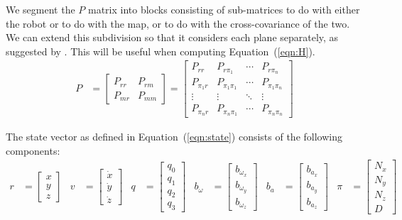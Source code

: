\documentclass[]{article}
\begin{document}
{We segment the $P$ matrix into blocks consisting of sub-matrices to do with either the robot or to do with the map, or to do with the cross-covariance of the two. We can extend this subdivision so that it considers each plane separately, as suggested by \cite{Sola2013}.
This will be useful when computing Equation~(\ref{eqn:H}).
\begin{align}
	P &=
	\left[
	\begin{matrix}
		P_{rr} 	& P_{rm} \\
		P_{mr} 	& P_{mm}
	\end{matrix}
	\right]
	=
	\left[
	\begin{matrix}
		P_{rr} 		& P_{r \pi_1} 		& \cdots 	& P_{r \pi_n} \\
		P_{\pi_1 r} & P_{\pi_1 \pi_1}	& \cdots 	& P_{\pi_1 \pi_n} \\
		\vdots		& \vdots 			& \ddots 	& \vdots \\
		P_{\pi_n r} & P_{\pi_n \pi_1} 	& \cdots 	& P_{\pi_n \pi_n}
	\end{matrix}
	\right]
	\label{eqn:Pparts}
\end{align}

The state vector as defined in Equation~(\ref{eqn:state}) consists of the following components:
\begin{align}
	r &= 
	\left[
	\begin{matrix}
		x \\
		y \\
		z
	\end{matrix}
	\right]
	&
	v &=
	\left[
	\begin{matrix}
		\dot{x} \\
		\dot{y} \\
		\dot{z}
	\end{matrix}
	\right]
	&
	q &=
	\left[
	\begin{matrix}
		q_0 \\
		q_1 \\
		q_2 \\
		q_3
	\end{matrix}
	\right]
	&
	b_\omega &=
	\left[
	\begin{matrix}
		b_{\omega_x} \\
		b_{\omega_y} \\
		b_{\omega_z} 
	\end{matrix}
	\right]
	&
	b_a &=
	\left[
	\begin{matrix}
		b_{a_x} \\
		b_{a_y} \\
		b_{a_z} 
	\end{matrix}
	\right]
	&
	\pi &=
	\left[
	\begin{matrix}
		N_x \\
		N_y \\
		N_z \\
		D
	\end{matrix}
	\right]
\end{align}

}
\end{document}
